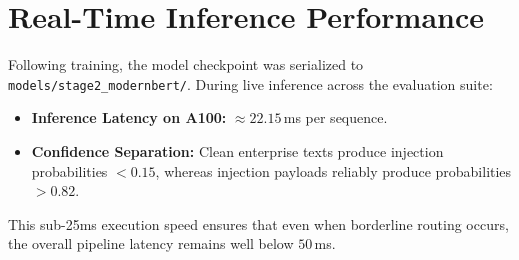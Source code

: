 \section{Real-Time Inference Performance}
Following training, the model checkpoint was serialized to \texttt{models/stage2\_modernbert/}. During live inference across the evaluation suite:
\begin{itemize}
    \item \textbf{Inference Latency on A100:} $\approx 22.15$\,ms per sequence.
    \item \textbf{Confidence Separation:} Clean enterprise texts produce injection probabilities $< 0.15$, whereas injection payloads reliably produce probabilities $> 0.82$.
\end{itemize}
This sub-25ms execution speed ensures that even when borderline routing occurs, the overall pipeline latency remains well below $50$\,ms.
